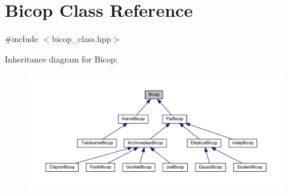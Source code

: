 \hypertarget{class_bicop}{\section{Bicop Class Reference}
\label{class_bicop}
}


{\ttfamily \#include $<$bicop\+\_\+class.\+hpp$>$}



Inheritance diagram for Bicop\+:\nopagebreak
\begin{figure}[H]
\begin{center}
\leavevmode
\includegraphics[width=350pt]{class_bicop__inherit__graph}
\end{center}
\end{figure}
